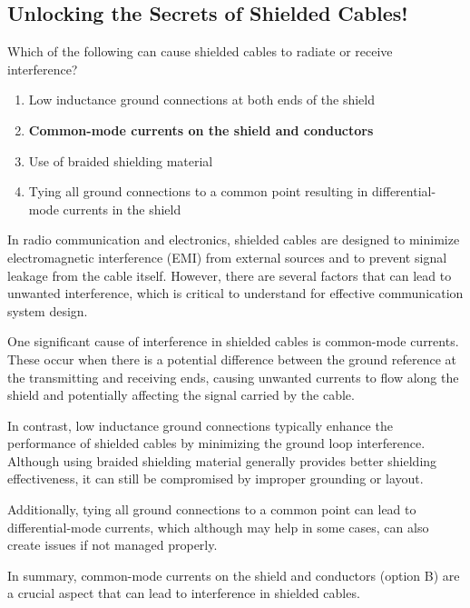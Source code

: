 \subsection{Unlocking the Secrets of Shielded Cables!}

\begin{tcolorbox}[colback=gray!10, colframe=black, title=E4E07] 

Which of the following can cause shielded cables to radiate or receive interference?

\begin{enumerate}[label=\Alph*.]
    \item Low inductance ground connections at both ends of the shield
    \item \textbf{Common-mode currents on the shield and conductors}
    \item Use of braided shielding material
    \item Tying all ground connections to a common point resulting in differential-mode currents in the shield
\end{enumerate} \end{tcolorbox}

In radio communication and electronics, shielded cables are designed to minimize electromagnetic interference (EMI) from external sources and to prevent signal leakage from the cable itself. However, there are several factors that can lead to unwanted interference, which is critical to understand for effective communication system design.

One significant cause of interference in shielded cables is common-mode currents. These occur when there is a potential difference between the ground reference at the transmitting and receiving ends, causing unwanted currents to flow along the shield and potentially affecting the signal carried by the cable. 

In contrast, low inductance ground connections typically enhance the performance of shielded cables by minimizing the ground loop interference. Although using braided shielding material generally provides better shielding effectiveness, it can still be compromised by improper grounding or layout.

Additionally, tying all ground connections to a common point can lead to differential-mode currents, which although may help in some cases, can also create issues if not managed properly. 

In summary, common-mode currents on the shield and conductors (option B) are a crucial aspect that can lead to interference in shielded cables.

